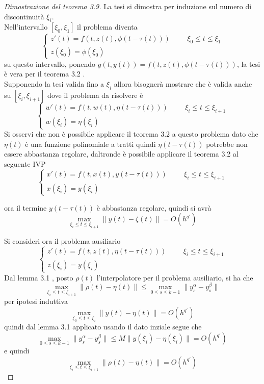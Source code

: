 \begin{proof}[Dimostrazione del teorema 3.9]
 La tesi si dimostra per induzione sul numero di discontinuità $\xi_i$. \\
Nell'intervallo $[\xi_0, \xi_1]$ il problema diventa
	  $$
	  \begin{cases}
	   z'(t) = f(t,z(t),\phi(t-\tau(t)))	\hspace{1cm}	\xi_0 \le t \le \xi_1	\\
	   z(\xi_0)=\phi(\xi_0)
	  \end{cases}
	  $$
su questo intervallo, ponendo $g(t,y(t))=f(t,z(t),\phi(t-\tau(t)))$, la tesi è vera per il teorema 3.2 .	\\
Supponendo la tesi valida fino a $\xi_i$ allora bisognerà mostrare che è valida anche su $[\xi_i, \xi_{i+1}]$ dove il problema da risolvere è
$$
\begin{cases}
 w'(t) = f (t,w(t),\eta(t-\tau(t)))	\hspace{1cm}	\xi_i \le t \le \xi_{i+1}	\\
 w(\xi_i)=\eta(\xi_i)
\end{cases}
$$
Si osservi che non è possibile applicare il teorema 3.2 a questo problema dato che $\eta(t)$ è una funzione polinomiale a tratti quindi 
$\eta(t-\tau(t))$ potrebbe non essere abbastanza regolare, daltronde è possibile applicare il teorema 3.2 al seguente IVP
\begin{equation}
\begin{cases}
 x'(t) = f (t,x(t),y(t-\tau(t)))	\hspace{1cm}	\xi_i \le t \le \xi_{i+1}	\\
 x(\xi_i)=y(\xi_i)
\end{cases}
\end{equation}

ora il termine $y(t-\tau(t))$ è abbastanza regolare, quindi si avrà
\begin{equation}
\max_{\xi_i \le t \le \xi_{i+1}} \| y(t) -  \zeta(t) \| = O(h^{q'})
\end{equation}

Si consideri ora il problema ausiliario
$$
\begin{cases}
 z'(t) = f(t,z(t),\eta(t-\tau(t)))	\hspace{1cm}	\xi_i \le t \le \xi_{i+1}	\\
 z(\xi_i)=y(\xi_i)
\end{cases}
$$
Dal lemma 3.1 , posto $\rho(t)$ l'interpolatore per il problema ausiliario,  si ha che
$$
\max_{\xi_i \le t \le \xi_{i+1}} \| \rho(t) - \eta(t) \| \le \max_{0 \le s \le k-1} \| y_s^\alpha - y_s^\beta \|
$$
per ipotesi induttiva
$$
\max_{\xi_0 \le t \le \xi_i} \| y(t) - \eta(t) \| = O(h^{q'})
$$
quindi dal lemma 3.1 applicato usando il dato inziale segue che
$$
\max_{0 \le s \le k-1} \|  y_s^\alpha - y_s^\beta \| \le M \| y(\xi_i) - \eta(\xi_i) \| = O(h^{q'})
$$
e quindi
\begin{equation}
\max_{\xi_i \le t \le \xi_{i+1}} \| \rho(t) - \eta(t) \| = O(h^{q'}) 
\end{equation}


\end{proof}
